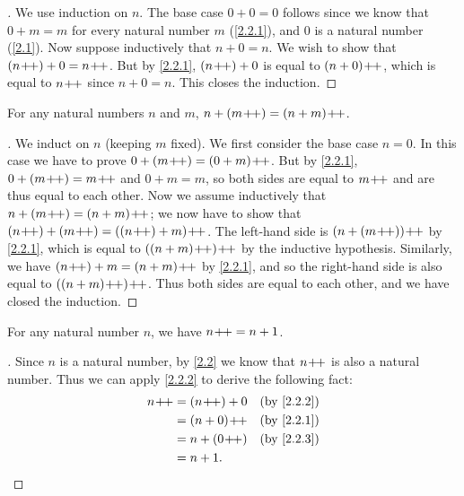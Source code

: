 \begin{proof}[]
  We use induction on \(n\).
  The base case \(0 + 0 = 0\) follows since we know that \(0 + m = m\) for every natural number \(m\) (\cref{2.2.1}), and \(0\) is a natural number (\cref{2.1}).
  Now suppose inductively that \(n + 0 = n\).
  We wish to show that \((n\!+\!\!+) + 0 = n\!+\!\!+\).
  But by \cref{2.2.1}, \((n\!+\!\!+) + 0\) is equal to \((n + 0)\!+\!\!+\), which is equal to \(n\!+\!\!+\) since \(n + 0 = n\).
  This closes the induction.
\end{proof}

\begin{lem}\label{2.2.3}
  For any natural numbers \(n\) and \(m\), \(n + (m\!+\!\!+) = (n + m)\!+\!\!+\).
\end{lem}

\begin{proof}[]
  We induct on \(n\) (keeping \(m\) fixed).
  We first consider the base case \(n = 0\).
  In this case we have to prove \(0 + (m\!+\!\!+) = (0 + m)\!+\!\!+\).
  But by \cref{2.2.1}, \(0 + (m\!+\!\!+) = m\!+\!\!+\) and \(0 + m = m\), so both sides are equal to \(m\!+\!\!+\) and are thus equal to each other.
  Now we assume inductively that \(n + (m\!+\!\!+) = (n + m)\!+\!\!+\);
  we now have to show that \((n\pp) + (m\pp) = ((n\pp) + m)\pp\).
  The left-hand side is \((n + (m\!+\!\!+))\!+\!\!+\) by \cref{2.2.1}, which is equal to \(((n+m)\!+\!\!+)\!+\!\!+\) by the inductive hypothesis.
  Similarly, we have \((n\!+\!\!+) + m = (n + m)\!+\!\!+\) by \cref{2.2.1}, and so the right-hand side is also equal to \(((n + m)\!+\!\!+)\!+\!\!+\).
  Thus both sides are equal to each other, and we have closed the induction.
\end{proof}

\begin{ac}\label{ac:2.2.2}
  For any natural number \(n\), we have \(n\!+\!\!+ = n + 1\).
\end{ac}

\begin{proof}[]
  Since \(n\) is a natural number, by \cref{2.2} we know that \(n\!+\!\!+\) is also a natural number.
  Thus we can apply \cref{2.2.2} to derive the following fact:
  \begin{align*}
    n\pp & = (n\pp) + 0 &  & \by{2.2.2} \\
         & = (n + 0)\pp &  & \by{2.2.1} \\
         & = n + (0\pp) &  & \by{2.2.3} \\
         & = n + 1.
  \end{align*}
\end{proof}

